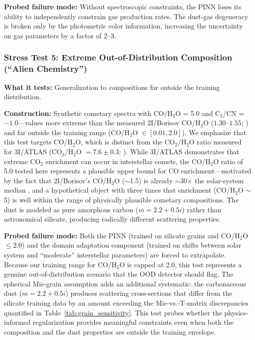 \documentclass[usenatbib]{mnras}
\begin{document}
\textbf{Probed failure mode:} Without spectroscopic constraints, the PINN loses its ability to independently constrain gas production rates. The dust-gas degeneracy is broken only by the photometric color information, increasing the uncertainty on gas parameters by a factor of 2--3.

\subsubsection{Stress Test 5: Extreme Out-of-Distribution Composition (``Alien Chemistry'')}

\textbf{What it tests:} Generalization to compositions far outside the training distribution.

\textbf{Construction:} Synthetic cometary spectra with CO/H$_2$O = 5.0 and C$_2$/CN = $-1.0$---values more extreme than the measured 2I/Borisov CO/H$_2$O ($1.30$--$1.55$; \citealt{bodewits20}) and far outside the training range (CO/H$_2$O $\in [0.01, 2.0]$). We emphasize that this test targets CO/H$_2$O, which is distinct from the CO$_2$/H$_2$O ratio measured for 3I/ATLAS (CO$_2$/H$_2$O $= 7.6 \pm 0.3$; \citealt{cordiner25}). While 3I/ATLAS demonstrates that extreme CO$_2$ enrichment can occur in interstellar comets, the CO/H$_2$O ratio of 5.0 tested here represents a plausible upper bound for CO enrichment---motivated by the fact that 2I/Borisov's CO/H$_2$O ($\sim$1.5) is already $\sim$30$\times$ the solar-system median \citep{bockelee04}, and a hypothetical object with three times that enrichment (CO/H$_2$O $\sim$ 5) is well within the range of physically plausible cometary compositions. The dust is modeled as pure amorphous carbon ($m = 2.2 + 0.5i$) rather than astronomical silicate, producing radically different scattering properties.

\textbf{Probed failure mode:} Both the PINN (trained on silicate grains and CO/H$_2$O $\leq 2.0$) and the domain adaptation component (trained on shifts between solar system and ``moderate'' interstellar parameters) are forced to extrapolate. Because our training range for CO/H$_2$O is capped at 2.0, this test represents a genuine out-of-distribution scenario that the OOD detector should flag. The spherical Mie-grain assumption adds an additional systematic: the carbonaceous dust ($m = 2.2 + 0.5i$) produces scattering cross-sections that differ from the silicate training data by an amount exceeding the Mie-vs.-T-matrix discrepancies quantified in Table~\ref{tab:grain_sensitivity}. This test probes whether the physics-informed regularization provides meaningful constraints even when both the composition and the dust properties are outside the training envelope.
\end{document}
